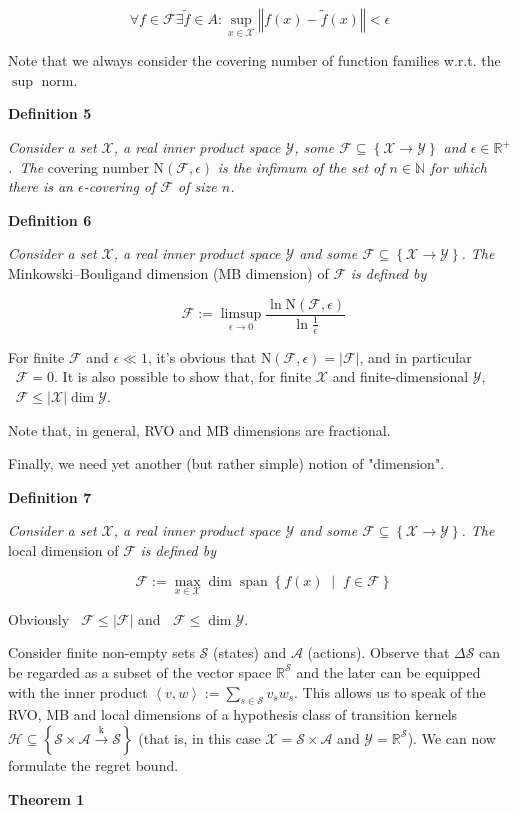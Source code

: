 \documentclass[a4paper]{article}
\newcommand{\Co}[1]{}
\DeclareMathOperator{\Sp}{span}
\newcommand{\AC}[1]{\left\{#1\right\}}
\newcommand{\ACM}[2]{\left\{#1\;\middle\vert\;#2\right\}}
\newcommand{\Nats}{\mathbb{N}}
\newcommand{\Reals}{\mathbb{R}}
\newcommand{\Abs}[1]{\left\vert #1 \right\vert}
\newcommand{\Norm}[1]{\left\Vert #1 \right\Vert}
\newcommand{\Chev}[1]{\left\langle #1 \right\rangle}
\newcommand{\K}{\xrightarrow{\mathrm{k}}}
\newcommand{\X}{\mathcal{X}}
\newcommand{\Y}{\mathcal{Y}}
\newcommand{\F}{\mathcal{F}}
\newcommand{\St}{\mathcal{S}}
\newcommand{\A}{\mathcal{A}}
\newcommand{\Hy}{\mathcal{H}}
\DeclareMathOperator{\MB}{\dim_{MB}}
\DeclareMathOperator{\LD}{\dim_{loc}}
\newcommand{\N}{\mathrm{N}}
\begin{document}
$$\forall f\in\F\exists\tilde{f}\in A: \sup_{x\in\X}\Norm{f(x)-\tilde{f}(x)}<\epsilon$$

Note that we always consider the covering number of function families w.r.t. the $\sup$ norm.

\textbf{Definition 5}\Co{b}

\textit{Consider a set $\X$, a real inner product space $\Y$, some $\F\subseteq\AC{\X\rightarrow\Y}$ and $\epsilon\in\Reals^+$.\ The}\Co{i} covering number $\N(\F,\epsilon)$ \textit{is the infimum of the set of $n\in\Nats$ for which there is an $\epsilon$-covering of $\F$ of size $n$.}\Co{i}

\textbf{Definition 6}\Co{b}

\textit{Consider a set $\X$, a real inner product space $\Y$ and some $\F\subseteq\AC{\X\rightarrow\Y}$. The}\Co{i} Minkowski–Bouligand dimension (MB dimension) of $\F$ \textit{is defined by}\Co{i}

$$\MB{\F}:=\limsup_{\epsilon \rightarrow 0}{\frac{\ln{\N(\F,\epsilon)}}{\ln\frac{1}{\epsilon}}}$$

For finite $\F$ and $\epsilon\ll1$, it's obvious that $\N(\F,\epsilon)=\Abs{\F}$, and in particular $\MB\F=0$. It is also possible to show that, for finite $\X$ and finite-dimensional $\Y$, $\MB{\F}\leq\Abs{\X}\dim{\Y}$.

Note that, in general, RVO and MB dimensions are fractional.

Finally, we need yet another (but rather simple) notion of "dimension".

\textbf{Definition 7}\Co{b}

\textit{Consider a set $\X$, a real inner product space $\Y$ and some $\F\subseteq\AC{\X\rightarrow\Y}$. The}\Co{i} local dimension of $\F$ \textit{is defined by}\Co{i}

$$\LD{\F}:=\max_{x\in\X}{\dim\Sp\ACM{f(x)}{f\in\F}}$$

Obviously $\LD{\F}\leq\Abs{\F}$ and $\LD{\F}\leq\dim{\Y}$.

Consider finite non-empty sets $\St$ (states) and $\A$ (actions). Observe that $\Delta\St$ can be regarded as a subset of the vector space $\Reals^\St$ and the later can be equipped with the inner product $\Chev{v,w}:=\sum_{s\in\St} v_s w_s$. This allows us to speak of the RVO, MB and local dimensions of a hypothesis class of transition kernels $\Hy\subseteq\AC{\St\times\A\K\St}$ (that is, in this case $\X=\St\times\A$ and $\Y=\Reals^\St$). We can now formulate the regret bound.

\textbf{Theorem 1}\Co{b}
\end{document}
